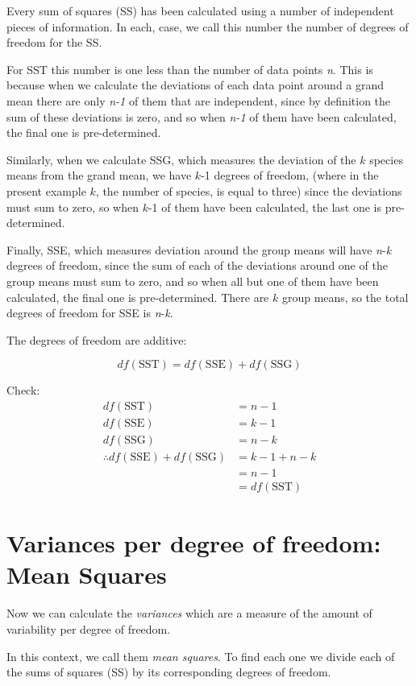 \documentclass[
  letterpaper,
  DIV=11,
  numbers=noendperiod]{scrreprt}
\begin{document}
Every sum of squares (SS) has been calculated using a number of
independent pieces of information. In each, case, we call this number
the number of degrees of freedom for the SS.

For SST this number is one less than the number of data points \emph{n}.
This is because when we calculate the deviations of each data point
around a grand mean there are only \emph{n-1} of them that are
independent, since by definition the sum of these deviations is zero,
and so when \emph{n-1} of them have been calculated, the final one is
pre-determined.

Similarly, when we calculate SSG, which measures the deviation of the
\(k\) species means from the grand mean, we have \(k\)-1 degrees of
freedom, (where in the present example \(k\), the number of species, is
equal to three) since the deviations must sum to zero, so when \(k\)-1
of them have been calculated, the last one is pre-determined.

Finally, SSE, which measures deviation around the group means will have
\emph{n}-\emph{k} degrees of freedom, since the sum of each of the
deviations around one of the group means must sum to zero, and so when
all but one of them have been calculated, the final one is
pre-determined. There are \(k\) group means, so the total degrees of
freedom for SSE is \emph{n}-\emph{k}.

The degrees of freedom are additive:

\[
df(\text{SST}) = df(\text{SSE}) + df(\text{SSG})
\]

Check: \[
\begin{align*}
df(\text{SST}) &= n-1\\
df(\text{SSE}) &= k-1\\
df(\text{SSG}) &= n-k\\
\therefore df(\text{SSE}) + df(\text{SSG}) &= k-1 + n-k\\
&=n-1\\
&=df(\text{SST}) 
\end{align*}
\]

\section{Variances per degree of freedom: Mean
Squares}\label{variances-per-degree-of-freedom-mean-squares}

Now we can calculate the \emph{variances} which are a measure of the
amount of variability per degree of freedom.

In this context, we call them \emph{mean squares}. To find each one we
divide each of the sums of squares (SS) by its corresponding degrees of
freedom.
\end{document}
